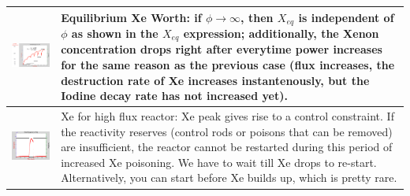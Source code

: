 \documentclass{school-22.211-notes}
\begin{document}
\begin{table}
\begin{tabular}{|p{}|p{}|}
%
    \begin{minipage}[b]{0.6\textwidth}
      \includegraphics[width=3.5in]{images/dfs/I-Xe-3.png}
    \end{minipage}
 &  
    \begin{minipage}[b]{0.4\textwidth}    
      Equilibrium Xe Worth: if $\phi \to \infty$, then $X_{eq}$ is independent of $\phi$ as shown in the $X_{eq}$ expression; additionally, the Xenon concentration drops right after everytime power increases for the same reason as the previous case (flux increases, the destruction rate of Xe increases instantenously, but the Iodine decay rate has not increased yet). 
    \end{minipage} \\ \hline
%
    \begin{minipage}[b]{0.6\textwidth}
    \includegraphics[width=3.5in]{images/dfs/I-Xe-4.png}
    \end{minipage}
 &  
    \begin{minipage}[b]{0.4\textwidth}
      Xe for high flux reactor: Xe peak gives rise to a control constraint. If the reactivity reserves (control rods or poisons that can be removed) are insufficient, the reactor cannot be restarted during this period of increased Xe poisoning. We have to wait till Xe drops to re-start. Alternatively, you can start before Xe builds up, which is pretty rare. 
      \end{minipage} \\ \hline
  \end{tabular}
\end{table}
\end{document}
